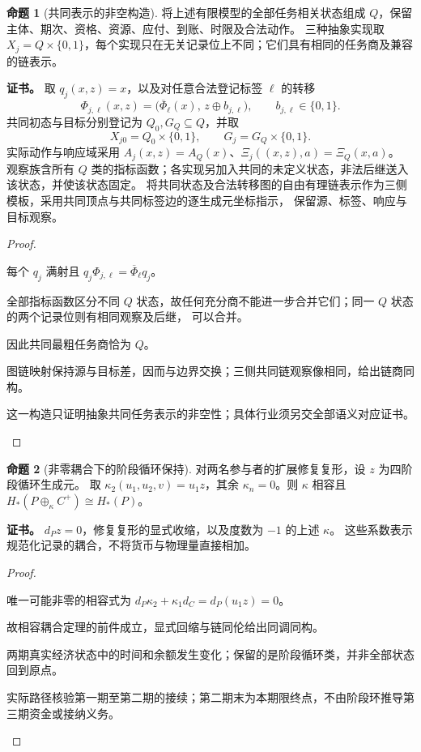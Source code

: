 \documentclass[UTF8,12pt,a4paper,openany,fontset=none,zihao=false]{ctexrep}
\theoremstyle{definition}
\newtheorem{proposition}{命题}[chapter]
\newenvironment{certificate}{\par\noindent\textbf{证书。}\ignorespaces}{\par}
\newcommand{\1}{\mathbf 1}
\begin{document}
\begin{proposition}[共同表示的非空构造]
将上述有限模型的全部任务相关状态组成 \(Q\)，保留主体、期次、资格、资源、应付、到账、时限及合法动作。
三种抽象实现取 \(X_j=Q\times\{0,1\}\)，每个实现只在无关记录位上不同；它们具有相同的任务商及兼容的链表示。
\end{proposition}
\begin{certificate}
取 \(q_j(x,z)=x\)，以及对任意合法登记标签 \(\ell\) 的转移
\[
\Phi_{j,\ell}(x,z)=\bigl(\overline\Phi_\ell(x),\,z\mathbin{\oplus}b_{j,\ell}\bigr),
\qquad b_{j,\ell}\in\{0,1\}.
\]
共同初态与目标分别登记为 \(Q_0,G_Q\subseteq Q\)，并取
\[
X_{j0}=Q_0\times\{0,1\},\qquad
G_j=G_Q\times\{0,1\}.
\]
实际动作与响应域采用
\(A_j(x,z)=A_Q(x)\)、\(\Xi_j((x,z),a)=\Xi_Q(x,a)\)。
观察族含所有 \(Q\) 类的指标函数；各实现另加入共同的未定义状态，非法后继送入该状态，并使该状态固定。
将共同状态及合法转移图的自由有理链表示作为三侧模板，采用共同顶点与共同标签边的逐生成元坐标指示，
保留源、标签、响应与目标观察。
\end{certificate}
\begin{proof}
\begin{semanticsteps}
\item 每个 \(q_j\) 满射且 \(q_j\Phi_{j,\ell}=\overline\Phi_\ell q_j\)。
\item 全部指标函数区分不同 \(Q\) 状态，故任何充分商不能进一步合并它们；同一 \(Q\) 状态的两个记录位则有相同观察及后继，
可以合并。
\item 因此共同最粗任务商恰为 \(Q\)。
\item 图链映射保持源与目标差，因而与边界交换；三侧共同链观察像相同，给出链商同构。
\item 这一构造只证明抽象共同任务表示的非空性；具体行业须另交全部语义对应证书。
\end{semanticsteps}
\end{proof}

\begin{proposition}[非零耦合下的阶段循环保持]
对两名参与者的扩展修复复形，设 \(z\) 为四阶段循环生成元。
取 \(\kappa_2(u_1,u_2,v)=u_1z\)，其余 \(\kappa_n=0\)。则 \(\kappa\) 相容且
\(H_\ast(P\oplus_\kappa C^+)\cong H_\ast(P)\)。
\end{proposition}
\begin{certificate}
\(d_Pz=0\)，修复复形的显式收缩，以及度数为 \(-1\) 的上述 \(\kappa\)。
这些系数表示规范化记录的耦合，不将货币与物理量直接相加。
\end{certificate}
\begin{proof}
\begin{semanticsteps}
\item 唯一可能非零的相容式为 \(d_P\kappa_2+\kappa_1d_C=d_P(u_1z)=0\)。
\item 故相容耦合定理的前件成立，显式回缩与链同伦给出同调同构。
\item 两期真实经济状态中的时间和余额发生变化；保留的是阶段循环类，并非全部状态回到原点。
\item 实际路径核验第一期至第二期的接续；第二期末为本期限终点，不由阶段环推导第三期资金或接纳义务。
\end{semanticsteps}
\end{proof}
\end{document}

